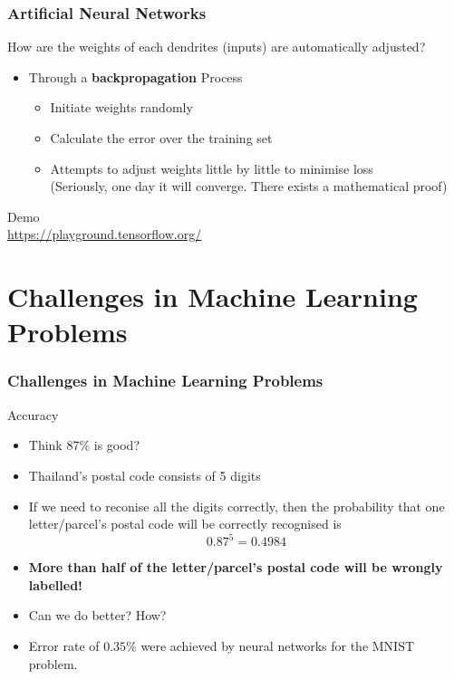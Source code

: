 \documentclass[aspectratio=169]{beamer}
\begin{document}
\begin{frame}
	\frametitle{Artificial Neural Networks}
	How are the weights of each dendrites (inputs) are automatically adjusted?
	\begin{itemize}
		\item<2-> Through a \textbf{backpropagation} Process
		\begin{itemize}
			\item<3-> Initiate weights randomly
			\item<4-> Calculate the error over the training set
			\item<5-> Attempts to adjust weights little by little to minimise loss\\
			{\onslide<6-> \tiny (Seriously, one day it will converge. There exists a mathematical proof)}
		\end{itemize}
	\end{itemize}
\end{frame}

\begin{frame}
	\begin{center}
		{\Huge Demo}\\
		\url{https://playground.tensorflow.org/}
	\end{center}
\end{frame}

\section{Challenges in Machine Learning Problems}

\begin{frame}
	\frametitle{Challenges in Machine Learning Problems}
	\begin{center}
		{\onslide<2-> \Huge Accuracy}
	\end{center}
	\begin{itemize}
		\item<3-> Think 87\% is good?
		\item<4-> Thailand's postal code consists of 5 digits
		\item<5-> If we need to reconise all the digits correctly, then the probability that one letter/parcel's postal code will be correctly recognised is $$0.87^{5} = 0.4984$$
		\item<6-> \textbf{More than half of the letter/parcel's postal code will be wrongly labelled!}
		\item<7-> Can we do better? How?
		\item<8-> Error rate of $0.35\%$ were achieved by neural networks for the MNIST problem.
	\end{itemize}
\end{frame}
\end{document}

